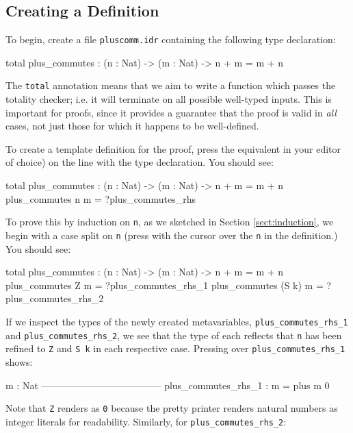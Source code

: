 \subsection{Creating a Definition}

To begin, create a file \texttt{pluscomm.idr}
containing the following type declaration:

\begin{code}
total
plus_commutes : (n : Nat) -> (m : Nat) -> n + m = m + n
\end{code}

\noindent
The \texttt{total} annotation means that we aim to write a function which
passes the totality checker; i.e. it will terminate on all possible
well-typed inputs. This is important for proofs, since it provides a
guarantee that the proof is valid in \emph{all} cases, not just those for
which it happens to be well-defined.

To create a template definition for the proof, press \mkdef{}
the equivalent in your editor of choice) on the line with the type
declaration. You should see:

\begin{code}
total
plus_commutes : (n : Nat) -> (m : Nat) -> n + m = m + n
plus_commutes n m = ?plus_commutes_rhs
\end{code}

\noindent
To prove this by induction on \texttt{n}, as we sketched in Section
\ref{sect:induction}, we begin with a case split on \texttt{n} (press
\csplit{}
with the cursor over the \texttt{n} in the definition.) You
should see:

\begin{code}
total
plus_commutes : (n : Nat) -> (m : Nat) -> n + m = m + n
plus_commutes Z m = ?plus_commutes_rhs_1
plus_commutes (S k) m = ?plus_commutes_rhs_2
\end{code}

\noindent
If we inspect the types of the newly created metavariables,
\texttt{plus\_commutes\_rhs\_1}
and
\texttt{plus\_commutes\_rhs\_2}, we see that the type of each reflects that
\texttt{n} has been refined to \texttt{Z} and \texttt{S k} in each respective
case. Pressing \ctype{} over \texttt{plus\_commutes\_rhs\_1} shows:

\begin{code}
  m : Nat
--------------------------------------
plus_commutes_rhs_1 : m = plus m 0
\end{code}

\noindent
Note that \texttt{Z} renders as \texttt{0} because the pretty printer renders
natural numbers as integer literals for readability.
Similarly, for \texttt{plus\_commutes\_rhs\_2}:

